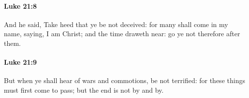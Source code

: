 		\paragraph{Luke 21:8} %
			\label{LUKE-21-8}

			And he said, Take heed that ye be not deceived: for many shall come in my name, saying, I am Christ; and the time draweth near: go ye not therefore after them.

			\begin{framed}
			\scriptsize
				\begin{compactdesc}
					\item[SBLG] 
				\end{compactdesc}
			\end{framed}

		\paragraph{Luke 21:9} %
			\label{LUKE-21-9}

			But when ye shall hear of wars and commotions, be not terrified: for these things must first come to pass; but the end is not by and by.

